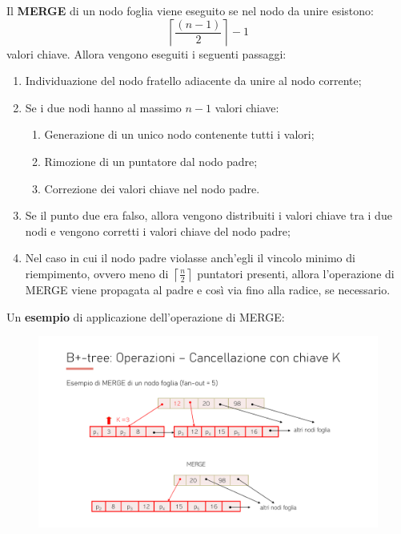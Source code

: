 \documentclass[a4paper]{article}
\begin{document}
	\noindent
	Il \textcolor{Red3}{\textbf{MERGE}} di un nodo foglia viene eseguito se nel nodo da unire esistono:
	\begin{equation*}
		\left\lceil \dfrac{\left(n-1\right)}{2} \right\rceil - 1
	\end{equation*}
	valori chiave. Allora vengono eseguiti i seguenti passaggi:
	\begin{enumerate}
		\item Individuazione del nodo fratello adiacente da unire al nodo corrente;

		\item Se i due nodi hanno al massimo $n-1$ valori chiave:
		\begin{enumerate}
			\item Generazione di un unico nodo contenente tutti i valori;
			\item Rimozione di un puntatore dal nodo padre;
			\item Correzione dei valori chiave nel nodo padre.
		\end{enumerate}

		\item Se il punto due era falso, allora vengono distribuiti i valori chiave tra i due nodi e vengono corretti i valori chiave del nodo padre;

		\item Nel caso in cui il nodo padre violasse anch'egli il vincolo minimo di riempimento, ovvero meno di $\left\lceil \frac{n}{2} \right\rceil$ puntatori presenti, allora l'operazione di MERGE viene propagata al padre e così via fino alla radice, se necessario.
	\end{enumerate}
	Un \textcolor{Green4}{\textbf{esempio}} di applicazione dell'operazione di MERGE:
	\begin{figure}[!htp]
		\centering
		\includegraphics[width=\textwidth]{img/eliminazione-2.pdf}
	\end{figure}\newpage
\end{document}
